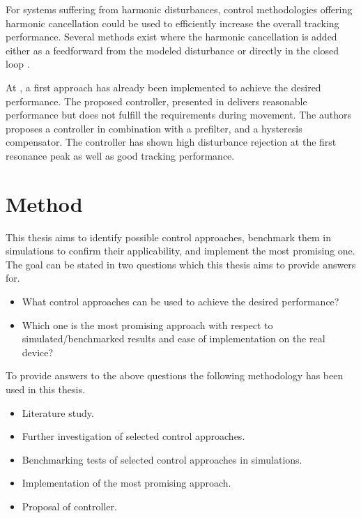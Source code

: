 For systems suffering from harmonic disturbances, control methodologies offering harmonic cancellation could be used to efficiently increase the overall tracking performance. Several methods exist where the harmonic cancellation is added either as a feedforward from the modeled disturbance \citep{fujimoto2009rro, vilanova2008disturbance} or directly in the closed loop \citep{IMP:Perry}.

At \abbrCERN, a first approach has already been implemented to achieve the desired performance. The proposed controller, presented in \citep{ButcherController:2015} delivers reasonable performance but does not fulfill the requirements during movement. The authors proposes a \abbrPID controller in combination with a prefilter, and a hysteresis compensator. The controller has shown high disturbance rejection at the first resonance peak as well as good tracking performance.

\section{Method}
This thesis aims to identify possible control approaches, benchmark them in simulations to confirm their applicability, and implement the most promising one. The goal can be stated in two questions which this thesis aims to provide answers for.

\begin{itemize}
  \item What control approaches can be used to achieve the desired performance?
  \item Which one is the most promising approach with respect to simulated/benchmarked results and ease of implementation on the real device?
\end{itemize}

To provide answers to the above questions the following methodology has been used in this thesis.

\begin{itemize}
  \item Literature study.
  \item Further investigation of selected control approaches.
  \item Benchmarking tests of selected control approaches in simulations.
  \item Implementation of the most promising approach.
  \item Proposal of controller.
\end{itemize}

